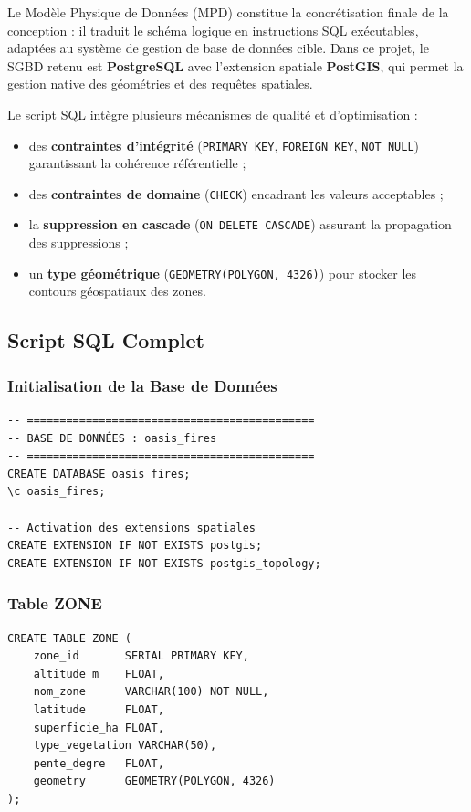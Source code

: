 \documentclass[12pt,a4paper]{report}
\begin{document}
Le Modèle Physique de Données (MPD) constitue la concrétisation finale de la conception : il traduit le schéma logique en instructions SQL exécutables, adaptées au système de gestion de base de données cible. Dans ce projet, le SGBD retenu est \textbf{PostgreSQL} avec l'extension spatiale \textbf{PostGIS}, qui permet la gestion native des géométries et des requêtes spatiales.

Le script SQL intègre plusieurs mécanismes de qualité et d'optimisation :
\begin{itemize}
  \item des \textbf{contraintes d'intégrité} (\texttt{PRIMARY KEY}, \texttt{FOREIGN KEY}, \texttt{NOT NULL}) garantissant la cohérence référentielle ;
  \item des \textbf{contraintes de domaine} (\texttt{CHECK}) encadrant les valeurs acceptables ;
  \item la \textbf{suppression en cascade} (\texttt{ON DELETE CASCADE}) assurant la propagation des suppressions ;
  \item un \textbf{type géométrique} (\texttt{GEOMETRY(POLYGON, 4326)}) pour stocker les contours géospatiaux des zones.
\end{itemize}

\subsection{Script SQL Complet}

\subsubsection{Initialisation de la Base de Données}

\begin{verbatim}
-- ============================================
-- BASE DE DONNÉES : oasis_fires
-- ============================================
CREATE DATABASE oasis_fires;
\c oasis_fires;

-- Activation des extensions spatiales
CREATE EXTENSION IF NOT EXISTS postgis;
CREATE EXTENSION IF NOT EXISTS postgis_topology;
\end{verbatim}

\subsubsection{Table ZONE}

\begin{verbatim}
CREATE TABLE ZONE (
    zone_id       SERIAL PRIMARY KEY,
    altitude_m    FLOAT,
    nom_zone      VARCHAR(100) NOT NULL,
    latitude      FLOAT,
    superficie_ha FLOAT,
    type_vegetation VARCHAR(50),
    pente_degre   FLOAT,
    geometry      GEOMETRY(POLYGON, 4326)
);
\end{verbatim}
\end{document}

